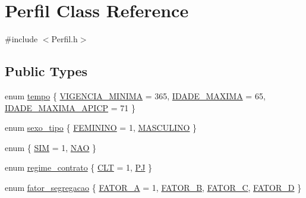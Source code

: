 \hypertarget{class_perfil}{}\section{Perfil Class Reference}
\label{class_perfil}


{\ttfamily \#include $<$Perfil.\+h$>$}

\subsection*{Public Types}
\begin{DoxyCompactItemize}
\item 
enum \hyperlink{class_perfil_ab771cb4d642b9c57fa6c585bcea335f3}{tempo} \{ \hyperlink{class_perfil_ab771cb4d642b9c57fa6c585bcea335f3a9c003caba60bd9a7cf7c52746bb6e0b2}{V\+I\+G\+E\+N\+C\+I\+A\+\_\+\+M\+I\+N\+I\+MA} = 365, 
\hyperlink{class_perfil_ab771cb4d642b9c57fa6c585bcea335f3a05e56c529fb915ffb0bf8004b3df04c9}{I\+D\+A\+D\+E\+\_\+\+M\+A\+X\+I\+MA} = 65, 
\hyperlink{class_perfil_ab771cb4d642b9c57fa6c585bcea335f3ac1becd537e502063c426dc298842bae2}{I\+D\+A\+D\+E\+\_\+\+M\+A\+X\+I\+M\+A\+\_\+\+A\+P\+I\+CP} = 71
 \}
\item 
enum \hyperlink{class_perfil_a07ccd896064bf4f787fb46a0d809f531}{sexo\+\_\+tipo} \{ \hyperlink{class_perfil_a07ccd896064bf4f787fb46a0d809f531ac98ef6887790c5ef95f80ae81611e3b7}{F\+E\+M\+I\+N\+I\+NO} = 1, 
\hyperlink{class_perfil_a07ccd896064bf4f787fb46a0d809f531a476dc9c03563ad1895d25d2b17a4e462}{M\+A\+S\+C\+U\+L\+I\+NO}
 \}
\item 
enum \{ \hyperlink{class_perfil_a9f55b99cc5dabbe0b75f0bce279107f3a643e2b60235b086a2bcd2c1aededfa61}{S\+IM} = 1, 
\hyperlink{class_perfil_a9f55b99cc5dabbe0b75f0bce279107f3ac94358468c320a7c2ba0f437aab8b600}{N\+AO}
 \}
\item 
enum \hyperlink{class_perfil_a2688d76eb997d87ba170d6fba8168901}{regime\+\_\+contrato} \{ \hyperlink{class_perfil_a2688d76eb997d87ba170d6fba8168901a4408d26d2c37edafc1d8af52e4294749}{C\+LT} = 1, 
\hyperlink{class_perfil_a2688d76eb997d87ba170d6fba8168901a33340bca22814a9ef6c12b3522757428}{PJ}
 \}
\item 
enum \hyperlink{class_perfil_a62df98cbddfe97746b0039e4daa22cd2}{fator\+\_\+segregacao} \{ \hyperlink{class_perfil_a62df98cbddfe97746b0039e4daa22cd2a6cec648ad9408b1c1922baf5ab80b6de}{F\+A\+T\+O\+R\+\_\+A} = 1, 
\hyperlink{class_perfil_a62df98cbddfe97746b0039e4daa22cd2a596919cdb44b16c51526e8a97b579f1d}{F\+A\+T\+O\+R\+\_\+B}, 
\hyperlink{class_perfil_a62df98cbddfe97746b0039e4daa22cd2aea6e16d8367918ba7e61787d9ab05403}{F\+A\+T\+O\+R\+\_\+C}, 
\hyperlink{class_perfil_a62df98cbddfe97746b0039e4daa22cd2a7281913972da3c79d9bdb5098e8b94cb}{F\+A\+T\+O\+R\+\_\+D}
 \}
\end{DoxyCompactItemize}
